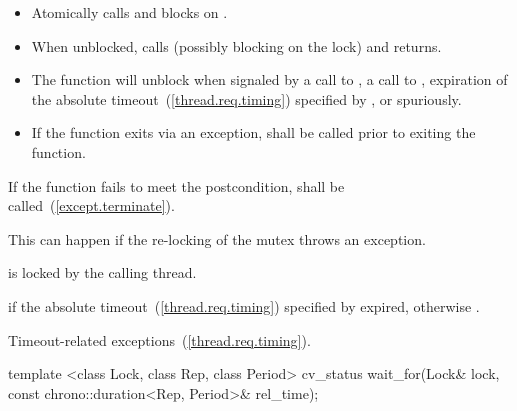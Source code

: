 \begin{itemdescr}
\pnum\effects

\begin{itemize}
\item
Atomically calls  and blocks on .

\item
When unblocked, calls  (possibly blocking on the lock) and returns.

\item
The function will unblock when signaled by a call to , a call to ,
expiration of the absolute timeout~(\ref{thread.req.timing}) specified by ,
or spuriously.

\item
If the function exits via an exception,  shall be called prior to exiting the function.
\end{itemize}

\pnum
\remarks
If the function fails to meet the postcondition, 
shall be called~(\ref{except.terminate}).
\begin{note} This can happen if the re-locking of the mutex throws an exception. \end{note}

\pnum
\postcondition {} is locked by the calling thread.

\pnum
\returns {} if
the absolute timeout~(\ref{thread.req.timing}) specified by  expired,
otherwise .

\pnum
\throws Timeout-related
exceptions~(\ref{thread.req.timing}).

\end{itemdescr}

%
%
\begin{itemdecl}
template <class Lock, class Rep, class Period>
  cv_status wait_for(Lock& lock, const chrono::duration<Rep, Period>& rel_time);
\end{itemdecl}

